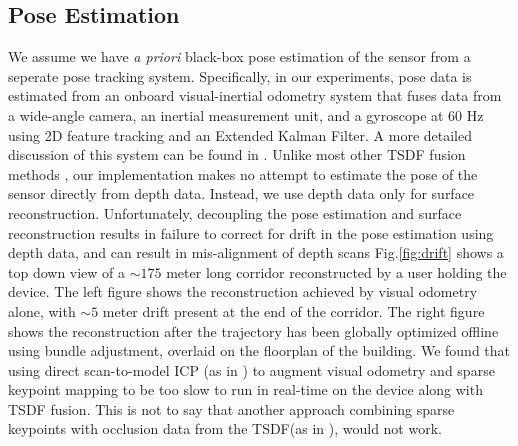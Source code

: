 \documentclass[conference]{IEEEtran}
\newcommand{\figref}[1]{Fig.\ref{#1}}
\newcommand{\TSDF}{TSDF\xspace}
\begin{document}
\subsection{Pose Estimation}
\label{section:pose}
We assume we  have \textit{a priori} black-box pose estimation of the
sensor from a seperate pose tracking system. Specifically, in our experiments,
pose data is estimated from an onboard visual-inertial odometry system that fuses
data from a wide-angle camera, an inertial measurement unit, and a gyroscope at
60 Hz using 2D feature tracking and an Extended Kalman Filter. A more detailed
discussion of this system can be found in \cite{VINS, VINS2}.  Unlike
most other \TSDF fusion methods \cite{Newcombe, Whelan2013,
Bylow2013, NiessnerHashing} , our implementation makes no attempt to estimate
the pose of the sensor directly from depth data. Instead, we use depth data 
only for surface reconstruction. Unfortunately, decoupling the pose estimation
and surface reconstruction results in failure to correct for drift in the pose
estimation using depth data, and can result in mis-alignment of depth scans
\figref{fig:drift} shows a top down view of a $\sim
175$ meter long corridor reconstructed by a user holding the device. The
left figure shows the reconstruction achieved by visual odometry alone,
with $\sim 5$ meter drift present at the end of the corridor. The right 
figure shows the reconstruction after the trajectory has been globally
optimized offline using bundle adjustment, overlaid on the floorplan of
 the building. We found that using direct scan-to-model ICP (as in
 \cite{Newcombe}) to augment visual odometry and sparse keypoint mapping to be
 too slow to run in real-time on the device along with \TSDF fusion. This is not
 to say that another approach combining sparse keypoints with occlusion data
 from the \TSDF (as in \cite{StuecklerSparseDense}), would not work.
\end{document}
